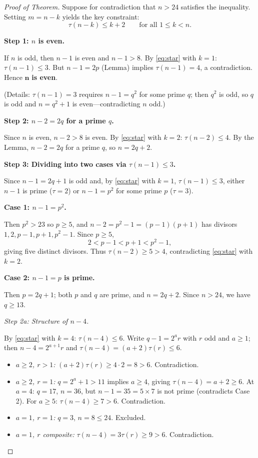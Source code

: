 \documentclass[11pt]{article}
\begin{document}
\begin{proof}[Proof of Theorem]
Suppose for contradiction that $n > 24$ satisfies the inequality.
Setting $m = n - k$ yields the key constraint:
\begin{equation}\label{eq:star}
  \tau(n-k) \le k + 2 \qquad \text{for all } 1 \le k < n. \tag{$*$}
\end{equation}

\medskip
\noindent\textbf{Step 1: $n$ is even.}

If $n$ is odd, then $n - 1$ is even and $n - 1 > 8$.  By \eqref{eq:star} with
$k = 1$: $\tau(n-1) \le 3$.  But $n - 1 = 2p$ (Lemma) implies $\tau(n-1) = 4$,
a contradiction.  Hence $\mathbf{n}$ \textbf{is even}.

(Details: $\tau(n - 1) = 3$ requires $n - 1 = q^2$ for some prime $q$; then
$q^2$ is odd, so $q$ is odd and $n = q^2 + 1$ is even---contradicting $n$ odd.)

\medskip
\noindent\textbf{Step 2: $n - 2 = 2q$ for a prime $q$.}

Since $n$ is even, $n - 2 > 8$ is even.  By \eqref{eq:star} with $k = 2$:
$\tau(n-2) \le 4$.  By the Lemma, $n - 2 = 2q$ for a prime $q$, so $n = 2q + 2$.

\medskip
\noindent\textbf{Step 3: Dividing into two cases via $\tau(n-1) \le 3$.}

Since $n - 1 = 2q + 1$ is odd and, by \eqref{eq:star} with $k = 1$,
$\tau(n-1) \le 3$, either $n - 1$ is prime ($\tau = 2$) or $n - 1 = p^2$ for
some prime $p$ ($\tau = 3$).

\bigskip
\noindent\textbf{Case 1: $n - 1 = p^2$.}

Then $p^2 > 23$ so $p \ge 5$, and
$n - 2 = p^2 - 1 = (p-1)(p+1)$
has divisors $1, 2, p-1, p+1, p^2-1$.  Since $p \ge 5$,
\[
  2 < p - 1 < p + 1 < p^2 - 1,
\]
giving five distinct divisors.  Thus $\tau(n-2) \ge 5 > 4$,
contradicting \eqref{eq:star} with $k = 2$.

\bigskip
\noindent\textbf{Case 2: $n - 1 = p$ is prime.}

Then $p = 2q + 1$; both $p$ and $q$ are prime, and $n = 2q + 2$.
Since $n > 24$, we have $q \ge 13$.

\medskip
\noindent\textit{Step 2a: Structure of $n - 4$.}

By \eqref{eq:star} with $k = 4$: $\tau(n-4) \le 6$.
Write $q - 1 = 2^a r$ with $r$ odd and $a \ge 1$; then $n - 4 = 2^{a+1}r$ and
$\tau(n-4) = (a+2)\tau(r) \le 6$.

\begin{itemize}
\item \emph{$a \ge 2$, $r > 1$:} $(a+2)\tau(r) \ge 4 \cdot 2 = 8 > 6$.
  Contradiction.
\item \emph{$a \ge 2$, $r = 1$:} $q = 2^a + 1 > 11$ implies $a \ge 4$, giving
  $\tau(n-4) = a + 2 \ge 6$.  At $a = 4$: $q = 17$, $n = 36$, but
  $n - 1 = 35 = 5 \times 7$ is not prime (contradicts Case 2).
  For $a \ge 5$: $\tau(n-4) \ge 7 > 6$.  Contradiction.
\item \emph{$a = 1$, $r = 1$:} $q = 3$, $n = 8 \le 24$.  Excluded.
\item \emph{$a = 1$, $r$ composite:} $\tau(n-4) = 3\tau(r) \ge 9 > 6$.
  Contradiction.
\end{itemize}


\end{proof}
\end{document}
